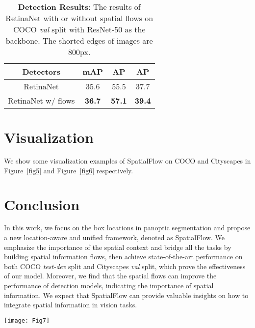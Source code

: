 \documentclass[journal,final]{IEEEtran}
\begin{document}
\begin{table}
  \centering
  \caption{\textbf{Detection Results}: The results of RetinaNet with or without spatial flows on COCO {\em val} split with ResNet-50 as the backbone. The shorted edges of images are 800px. }
  \label{tab10}
  \begin{tabular}{cccc}
    \toprule
    Detectors & mAP & AP & AP \\
    \midrule
    \midrule
    RetinaNet & 35.6 & 55.5 & 37.7 \\
    RetinaNet w/ flows & \textbf{36.7} & \textbf{57.1} & \textbf{39.4} \\
    \bottomrule
  \end{tabular}
\end{table}

\section{Visualization} \label{sec6}
We show some visualization examples of SpatialFlow on COCO and Cityscapes in Figure~\ref{fig5} and Figure~\ref{fig6} respectively.

\section{Conclusion} \label{sec7}
In this work, we focus on the box locations in panoptic segmentation and propose a new location-aware and unified framework, denoted as SpatialFlow. We emphasize the importance of the spatial context and bridge all the tasks by building spatial information flows, then achieve state-of-the-art performance on both COCO {\em test-dev} split and Cityscapes {\em val} split, which prove the effectiveness of our model. Moreover, we find that the spatial flows can improve the performance of detection models, indicating the importance of spatial information. We expect that SpatialFlow can provide valuable insights on how to integrate spatial information in vision tasks.
\begin{figure*}
  \centering
  \texttt{[image: Fig7]}
  \caption{An illustration of visualization examples of SpatialFlow on Cityscapes {\em val} split using a single ResNet-101 network.}
   \label{fig6}
\end{figure*}
\end{document}
